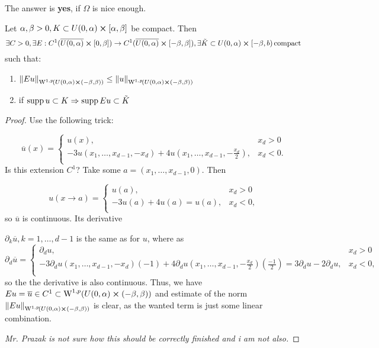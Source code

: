 \documentclass{article}
\begin{document}
The answer is \textbf{yes}, if $\Omega$ is nice enough.

\begin{lemma}
	Let $\alpha, \beta >0, K \subset U(0,\alpha) \cross [\alpha,\beta]$ be compact. Then
	\[
		\exists C>0, \exists E:C^1(\overline{U(0,\alpha)} \cross [0,\beta]) \to C^1(\overline{U(0,\alpha)} \cross [-\beta, \beta]), \exists \tilde{K} \subset U(0,\alpha) \cross [-\beta, b) \, \text{compact} \,
	\]
	such that:
	\begin{enumerate}
		\item $\norm{Eu}_{\WkpSet[1][p]{U(0,\alpha) \cross (-\beta,\beta)}} \leq \norm{u}_{\WkpSet[1][p]{U(0,\alpha) \cross (-\beta, \beta)}} $
		\item if $\operatorname{supp} u \subset K \Rightarrow \operatorname{supp} Eu \subset \tilde{K}$
	\end{enumerate}
\end{lemma}

\begin{proof}
Use the following trick:

\begin{equation*}
	\overline{u}(x) = 
	\begin{cases}
		u(x),& x_d > 0 \\
		-3u(x_1, \dots, x_{d-1}, -x_d) + 4u(x_1, \dots, x_{d-1},-\frac{x_d}{2}) ,& x_d < 0.\\
	\end{cases}
\end{equation*}
Is this extension $C^1$? Take some $a=(x_1,\dots, x_{d-1},0)$. Then

\begin{equation*}
	u(x \to a) = 
	\begin{cases}
		u(a), & x_d>0 \\
		-3u(a)+ 4u(a) = u(a), & x_d<0, \\
	\end{cases}
\end{equation*}
so $\overline{u}$ is continuous. Its derivative

$\partial_{k}\overline{u}, k=1, \dots, d-1$ is the same as for $u$, where as
\begin{equation*}
	\partial_{d}\overline{u} = 
	\begin{cases}
		\partial_{d}u ,& x_d >0 \\
		-3 \partial_{d} u (x_1,\dots,x_{d-1},-x_d)(-1) + 4 \partial_{d}u(x_1,\dots,x_{d-1},-\frac{x_d}{2}) (\frac{-1}{2}) = 3 \partial_{d} u - 2 \partial_{d}u ,& x_d<0,\\
	\end{cases}
\end{equation*}
so the the derivative is also continuous. Thus, we have $Eu = \overline{u} \in C^1 \subset \WkpSet[1][p]{U(0,\alpha) \cross (-\beta,\beta)}$ and estimate of the norm $\norm{Eu}_{\WkpSet[1][p]{U(0,\alpha) \cross (-\beta,\beta)}}$ is clear, as the wanted term is just some linear combination. 



\textit{Mr. Prazak is not sure how this should be correctly finished and i am not also.}
\end{proof}
\end{document}
